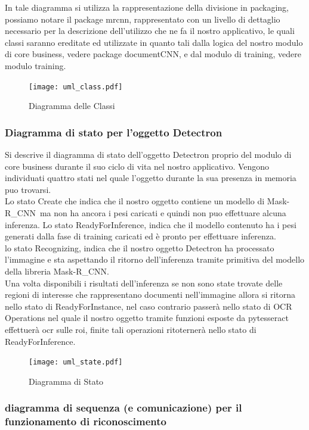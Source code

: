 \documentclass[12pt,a4paper]{article}
\newcommand{\mrcnn}{Mask-R\_CNN}
\begin{document}
In tale diagramma si utilizza la rappresentazione della divisione in
packaging, possiamo notare il package mrcnn, rappresentato con un livello di dettaglio
necessario per la descrizione dell'utilizzo che ne fa il nostro
applicativo, le quali classi saranno ereditate ed utilizzate in quanto
tali dalla logica del nostro modulo di core business, vedere package
documentCNN, e dal modulo di training, vedere modulo training.

\begin{figure}[H]
    \caption{Diagramma delle Classi}
    \centering
    \texttt{[image: uml\_class.pdf]}
\end{figure}


\subsubsection{Diagramma di stato per l'oggetto Detectron}

Si descrive il diagramma di stato dell'oggetto Detectron proprio del
modulo di core business durante il suo ciclo di vita  nel nostro
applicativo.
Vengono individuati quattro stati nel quale l'oggetto durante la sua presenza
in memoria puo trovarsi.\\
Lo stato Create che indica che il nostro oggetto contiene un modello di
\mrcnn\ ma non ha ancora i pesi caricati e quindi non puo effettuare
alcuna inferenza.
Lo stato ReadyForInference, indica che il modello contenuto ha i pesi
generati dalla fase di training caricati ed è pronto per effettuare
inferenza.\\
lo stato Recognizing, indica che il nostro oggetto Detectron ha
processato l'immagine e sta aspettando il ritorno dell'inferenza tramite
primitiva del modello della libreria \mrcnn.\\
Una volta disponibili i risultati dell'inferenza se non sono state trovate
delle regioni di interesse che rappresentano documenti nell'immagine
allora si ritorna nello stato di ReadyForInstance, nel caso contrario
passerà nello stato di OCR Operations nel quale il nostro oggetto
tramite funzioni esposte da pytesseract effettuerà ocr sulle roi, finite
tali operazioni ritoternerà nello stato di ReadyForInference.

\begin{figure}[H]
    \caption{Diagramma di Stato}
    \centering
    \texttt{[image: uml\_state.pdf]}
\end{figure}

\subsubsection{diagramma di sequenza (e comunicazione) per il
funzionamento di riconoscimento}
\end{document}
